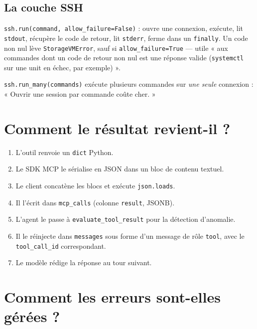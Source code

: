 \documentclass[11pt,a4paper]{report}
\newcommand{\fn}[1]{\texttt{\small\textcolor{oasisviolet}{#1}}}
\newcommand{\cls}[1]{\texttt{\small\textcolor{oasisblue}{#1}}}
\newcommand{\tbl}[1]{\texttt{\small\textcolor{oasisamber}{#1}}}
\begin{document}
\subsection*{La couche SSH}
\fn{ssh.run(command, allow\_failure=False)} : ouvre une connexion, exécute,
lit \texttt{stdout}, récupère le code de retour, lit \texttt{stderr}, ferme
dans un \texttt{finally}. Un code non nul lève \cls{StorageVMError}, sauf si
\texttt{allow\_failure=True} --- utile « aux commandes dont un code de retour non
nul est une réponse valide (\texttt{systemctl} sur une unit en échec, par
exemple) ».

\noindent
\fn{ssh.run\_many(commands)} exécute plusieurs commandes sur \emph{une seule}
connexion : « Ouvrir une session par commande coûte cher. »

\section{Comment le résultat revient-il ?}

\begin{enumerate}
  \item L'outil renvoie un \texttt{dict} Python.
  \item Le SDK MCP le sérialise en JSON dans un bloc de contenu textuel.
  \item Le client concatène les blocs et exécute \texttt{json.loads}.
  \item Il l'écrit dans \tbl{mcp\_calls} (colonne \texttt{result}, JSONB).
  \item L'agent le passe à \fn{evaluate\_tool\_result} pour la détection
  d'anomalie.
  \item Il le réinjecte dans \texttt{messages} sous forme d'un message de rôle
  \texttt{tool}, avec le \texttt{tool\_call\_id} correspondant.
  \item Le modèle rédige la réponse au tour suivant.
\end{enumerate}

\section{Comment les erreurs sont-elles gérées ?}
\end{document}
